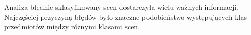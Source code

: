 Analiza błędnie sklasyfikowany scen dostarczyła wielu ważnych informacji. Najczęściej przyczyną błędów było znaczne podobieństwo występujących klas przedmiotów między różnymi klasami scen.


    
    
    
